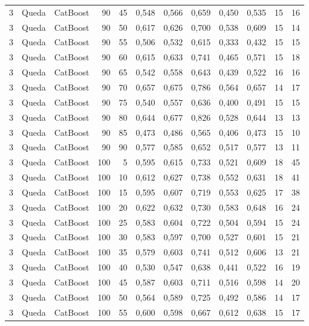 \begin{longtable}{@{}rllrrrrrrrrr@{}}
3 & Queda & CatBoost & 90 & 45 & 0,548 & 0,566 & 0,659 & 0,450 & 0,535 & 15 & 16 \\
3 & Queda & CatBoost & 90 & 50 & 0,617 & 0,626 & 0,700 & 0,538 & 0,609 & 15 & 14 \\
3 & Queda & CatBoost & 90 & 55 & 0,506 & 0,532 & 0,615 & 0,333 & 0,432 & 15 & 15 \\
3 & Queda & CatBoost & 90 & 60 & 0,615 & 0,633 & 0,741 & 0,465 & 0,571 & 15 & 18 \\
3 & Queda & CatBoost & 90 & 65 & 0,542 & 0,558 & 0,643 & 0,439 & 0,522 & 16 & 16 \\
3 & Queda & CatBoost & 90 & 70 & 0,657 & 0,675 & 0,786 & 0,564 & 0,657 & 14 & 17 \\
3 & Queda & CatBoost & 90 & 75 & 0,540 & 0,557 & 0,636 & 0,400 & 0,491 & 15 & 15 \\
3 & Queda & CatBoost & 90 & 80 & 0,644 & 0,677 & 0,826 & 0,528 & 0,644 & 13 & 13 \\
3 & Queda & CatBoost & 90 & 85 & 0,473 & 0,486 & 0,565 & 0,406 & 0,473 & 15 & 10 \\
3 & Queda & CatBoost & 90 & 90 & 0,577 & 0,585 & 0,652 & 0,517 & 0,577 & 13 & 11 \\
3 & Queda & CatBoost & 100 & 5 & 0,595 & 0,615 & 0,733 & 0,521 & 0,609 & 18 & 45 \\
3 & Queda & CatBoost & 100 & 10 & 0,612 & 0,627 & 0,738 & 0,552 & 0,631 & 18 & 41 \\
3 & Queda & CatBoost & 100 & 15 & 0,595 & 0,607 & 0,719 & 0,553 & 0,625 & 17 & 38 \\
3 & Queda & CatBoost & 100 & 20 & 0,622 & 0,632 & 0,730 & 0,583 & 0,648 & 16 & 24 \\
3 & Queda & CatBoost & 100 & 25 & 0,583 & 0,604 & 0,722 & 0,504 & 0,594 & 15 & 24 \\
3 & Queda & CatBoost & 100 & 30 & 0,583 & 0,597 & 0,700 & 0,527 & 0,601 & 15 & 21 \\
3 & Queda & CatBoost & 100 & 35 & 0,579 & 0,603 & 0,741 & 0,512 & 0,606 & 13 & 21 \\
3 & Queda & CatBoost & 100 & 40 & 0,530 & 0,547 & 0,638 & 0,441 & 0,522 & 16 & 19 \\
3 & Queda & CatBoost & 100 & 45 & 0,587 & 0,603 & 0,711 & 0,516 & 0,598 & 14 & 20 \\
3 & Queda & CatBoost & 100 & 50 & 0,564 & 0,589 & 0,725 & 0,492 & 0,586 & 14 & 17 \\
3 & Queda & CatBoost & 100 & 55 & 0,600 & 0,598 & 0,667 & 0,612 & 0,638 & 15 & 17 \\

\end{longtable}
